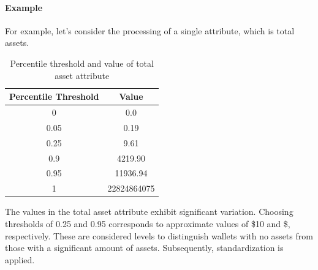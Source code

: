 \documentclass[../ICIT-Paper-2024.tex]{subfiles}
\begin{document}
\paragraph{Example}
For example, let's consider the processing of a single attribute, which is total assets.
\begin{table}[h!]
\centering
\caption{Percentile threshold and value of total asset attribute}\label{tab2}
\begin{tabular}{|c|c|}
\hline
\textbf{Percentile Threshold} & \textbf{Value} \\
\hline
0 & 0.0 \\
\hline
0.05 & 0.19 \\
\hline
0.25 & 9.61 \\
\hline
0.9 & 4219.90 \\
\hline
0.95 & 11936.94 \\
\hline
1 & 22824864075 \\
\hline
\end{tabular}

\label{tab:example}
\end{table}

The values in the total asset attribute exhibit significant variation. Choosing thresholds of 0.25 and 0.95 corresponds to approximate values of \$10 and \$, respectively. These are considered levels to distinguish wallets with no assets from those with a significant amount of assets. Subsequently, standardization is applied.
\end{document}
